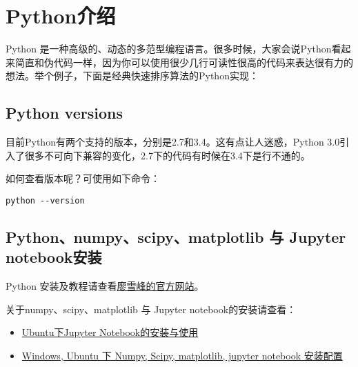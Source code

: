 \section{Python介绍}


Python 是一种高级的、动态的多范型编程语言。很多时候，大家会说Python看起来简直和伪代码一样，因为你可以使用很少几行可读性很高的代码来表达很有力的想法。举个例子，下面是经典快速排序算法的Python实现：



\subsection{Python versions}

%


目前Python有两个支持的版本，分别是2.7和3.4。这有点让人迷惑，Python 3.0引入了很多不可向下兼容的变化，2.7下的代码有时候在3.4下是行不通的。%

如何查看版本呢？可使用如下命令：

\begin{lstlisting}
python --version
\end{lstlisting}

\subsection{Python、numpy、scipy、matplotlib 与 Jupyter notebook安装}

Python 安装及教程请查看\href{https://www.liaoxuefeng.com/wiki/0014316089557264a6b348958f449949df42a6d3a2e542c000/0014316090478912dab2a3a9e8f4ed49d28854b292f85bb000}{廖雪峰的官方网站}。

关于numpy、scipy、matplotlib 与 Jupyter notebook的安装请查看：
\begin{itemize}
\item \href{http://www.linuxidc.com/Linux/2017-03/142295.htm}{Ubuntu下Jupyter Notebook的安装与使用}
\item \href{http://blog.csdn.net/withchris/article/details/51262211}{Windows, Ubuntu 下 Numpy, Scipy, matplotlib, jupyter notebook 安装配置}
\end{itemize}

